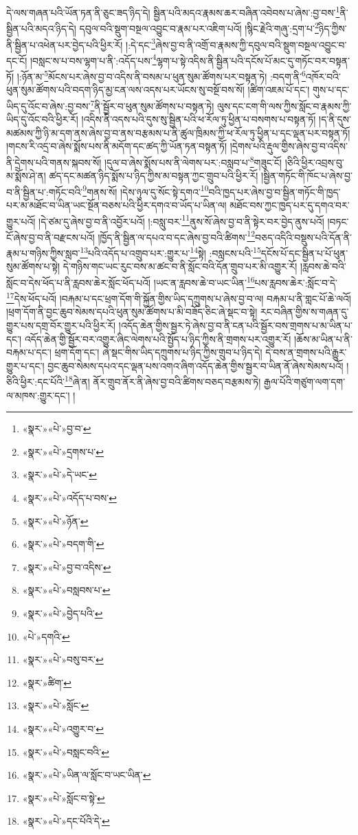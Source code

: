 དེ་ལས་གཞན་པའི་ཡོན་ཏན་ནི་ཅུང་ཟད་ཉིད་དེ། སྦྱིན་པའི་མདའ་རྣམས་ཆར་བཞིན་འབེབས་པ་ཞེས་:བྱ་བས་\footnote{«སྣར་»«པེ་»བྱ་བ་}ནི་སྦྱིན་པའི་མདའ་ཉིད་དེ། དབུལ་བའི་སྡུག་བསྔལ་འབྱུང་བ་རྣམ་པར་འཇིག་པའོ། །སྙིང་རྗེའི་གཞུ་:དྲག་པ་\footnote{«སྣར་»«པེ་»དྲགས་པ་}ཉིད་ཀྱིས་ནི་སྦྱིན་པ་འཕེན་པར་བྱེད་པའི་ཕྱིར་རོ། །:དེ་དང་\footnote{«སྣར་»«པེ་»དེ་ཡང་}ཞེས་བྱ་བ་ནི་འགྲོ་བ་རྣམས་ཀྱི་དབུལ་བའི་སྡུག་བསྔལ་འབྱུང་བ་དང་ངོ། །བསླང་ས་པ་བས་ལྷག་པ་ནི་:འདོད་པས་\footnote{«སྣར་»«པེ་»འདོད་པ་བས་}ལྷག་པ་སྟེ་འདིས་ནི་སྦྱིན་པའི་དངོས་པོ་མང་དུ་གཏོང་བར་བསྟན་ཏོ། །:ཉོན་མ་\footnote{«སྣར་»«པེ་»ཉོན་}མོངས་པར་ཞེས་བྱ་བ་འདིས་ནི་བསམ་པ་ཕུན་སུམ་ཚོགས་པར་བསྟན་ཏེ། :བདག་ནི་\footnote{«སྣར་»«པེ་»བདག་གི་}འཁོར་བའི་ཕུན་སུམ་ཚོགས་པའི་བདག་ཉིད་མྱ་ངན་ལས་འདས་པར་ཡོངས་སུ་བསྔོ་བས་སོ། །ཚིག་འཇམ་པོ་དང་། གུས་པ་དང་ཡིད་དུ་འོང་བ་ཞེས་:བྱ་བས་\footnote{«སྣར་»«པེ་»བྱ་བ་འདིས་}ནི་སྦྱོར་བ་ཕུན་སུམ་ཚོགས་པ་བསྟན་ཏེ། ལུས་དང་ངག་གི་ལས་ཀྱིས་སློང་བ་རྣམས་ཀྱི་ཡིད་དུ་འོང་བའི་ཕྱིར་རོ། །འདིས་ནི་འདས་པའི་དུས་སུ་སྦྱིན་པའི་ཕ་རོལ་ཏུ་ཕྱིན་པ་བསགས་པ་བསྟན་ཏོ། །ད་ནི་དུས་མཚམས་ཀྱི་ཉི་མ་དག་ནས་ཞེས་བྱ་བ་ནས་བརྩམས་པ་ནི་ཚུལ་ཁྲིམས་ཀྱི་ཕ་རོལ་ཏུ་ཕྱིན་པ་དང་ལྡན་པར་བསྟན་ཏོ། །གངས་རི་འདྲ་བ་ཞེས་སྨོས་པས་ནི་མདོག་དང་ཚད་ཀྱི་ཡོན་ཏན་བསྟན་ཏོ། །དྲེགས་པའི་རྡུལ་གྱིས་ཞེས་བྱ་བ་འདིས་ནི་དྲེགས་པའི་གནས་སྐབས་སོ། །དུལ་བ་ཞེས་སྨོས་པས་ནི་ལེགས་པར་:བསླབ་པ་\footnote{«སྣར་»«པེ་»བསླབས་པ་}གཟུང་ངོ། །ཅིའི་ཕྱིར་འབྲས་བུ་མ་སྨོས་ཤེ་ན། ཚད་དང་མཚན་ཉིད་སྨོས་པ་ཉིད་ཀྱིས་མ་བསྟན་ཀྱང་གྲུབ་པའི་ཕྱིར་རོ། །སྦྱིན་གཏོང་གི་ཁོང་པ་ཞེས་བྱ་བ་ནི་སྦྱིན་པ་:གཏོང་བའི་\footnote{«སྣར་»«པེ་»བྱེད་པའི་}གནས་སོ། །དེས་ཉུལ་དུ་སོང་སྟེ་དགའ་\footnote{«པེ་»དགའི་}བའི་ཁྱད་པར་ཞེས་བྱ་བ་སྦྱིན་གཏོང་གི་ཁྱད་པར་མ་མཐོང་བ་ཡིན་ཡང་སྔོན་བཅས་པའི་ཕྱིར་དགའ་བ་ཡོད་པ་ཡིན་ལ། མཐོང་བས་ཀྱང་ཁྱད་པར་དུ་དགའ་བར་གྱུར་པའོ། །དེ་ཙམ་དུ་ཞེས་བྱ་བ་ནི་འབྱོར་པའོ། །:བསླུ་བར་\footnote{«སྣར་»«པེ་»བསུ་བར་}ནུས་སོ་ཞེས་བྱ་བ་ནི་སྟེར་བར་བྱེད་ནུས་པའོ། །བཏང་ངོ་ཞེས་བྱ་བ་ནི་བརྫངས་པའོ། །ཁྱོད་ནི་སྦྱིན་ལ་དཔའ་བ་དང་ཞེས་བྱ་བའི་ཚིགས་\footnote{«སྣར་»ཚིག་}བཅད་འདིའི་བསྡུས་པའི་དོན་ནི་རྣམ་པ་གཉིས་ཀྱིས་སླབ་\footnote{«སྣར་»«པེ་»སློང་}པའི་འདོད་པ་འགྲུབ་པར་:གྱུར་པ་\footnote{«སྣར་»«པེ་»འགྱུར་བ་}སྟེ། :བསླངས་པའི་\footnote{«སྣར་»«པེ་»བསླང་བའི་}དངོས་པོ་དང་སྦྱིན་པ་པོ་ཕུན་སུམ་ཚོགས་པ་སྟེ། དེ་གཉིས་གང་ཡང་རུང་བས་མ་ཚང་བ་ནི་སློང་བའི་དོན་གྲུབ་པར་མི་འགྱུར་རོ། །རླབས་ཆེ་བའི་སློང་བ་དེས་ཕོད་པ་ནི་རླབས་ཆེར་སློང་ཕོད་པའོ། །ཡང་ན་རླབས་ཆེ་བ་ཡང་ཡིན་\footnote{«སྣར་»«པེ་»ཡིན་ལ་སློང་བ་ཡང་ཡིན་}པས་རླབས་ཆེར་:སློང་བ་དེ་\footnote{«སྣར་»«པེ་»སློང་བ་སྟེ་}དེས་ཕོད་པའོ། །བརྐམ་པ་དང་ཕྲག་དོག་གི་སྐྱོན་གྱིས་ཡིད་དཀྲུགས་པ་ཞེས་བྱ་བ་ལ། བརྐམ་པ་ནི་གླང་པོ་ཆེ་ལའོ། །ཕྲག་དོག་ནི་བྱང་ཆུབ་སེམས་དཔའི་ཕུན་སུམ་ཚོགས་པ་མི་བཟོད་ཅིང་ཞེ་སྡང་བ་སྟེ། རང་བཞིན་གྱིས་ས་གཞན་དུ་གྱུར་པས་དགྲ་བོར་གྱུར་པའི་ཕྱིར་རོ། །འདོད་ཆེན་གྱིས་སྦྱར་ཏེ་ཞེས་བྱ་བ་ནི་ངན་པའི་སྦྱོར་བས་གྲགས་པ་མ་ཡིན་པ་དང་། འདོད་ཆེན་གྱི་སྦྱོར་བར་འགྱུར་ཞིང་ལེགས་པའི་སྤྱོད་པ་ཉིད་ཀྱིས་ནི་གྲགས་པར་འགྱུར་རོ། །ཆོས་མ་ཡིན་པ་ནི་བརྐམ་པ་དང་། ཕྲག་དོག་དང་། ཞེ་སྡང་གིས་ཡིད་དཀྲུགས་པ་ཉིད་ཀྱིས་གྲུབ་པ་ཉིད་དེ། དེ་བས་ན་གྲགས་པའི་རྒྱུར་གྱུར་པ་དང་། བྱང་ཆུབ་སེམས་དཔའ་དང་ལྡན་པས་འགའ་ཞིག་འདོད་ཆེན་གྱིས་སྦྱར་བ་ཡིན་ནོ་ཞེས་སེམས་པའོ། །ཅིའི་ཕྱིར་:དང་པོའི་\footnote{«སྣར་»«པེ་»དང་པོའི་དེ་}ཞེ་ན། ནོར་གྲུབ་ནོར་ནི་ཞེས་བྱ་བའི་ཚིགས་བཅད་བརྩམས་ཏེ། རྒྱལ་པོའི་གཙུག་ལག་དག་ལ་མཁས་:གྱུར་དང་། །
